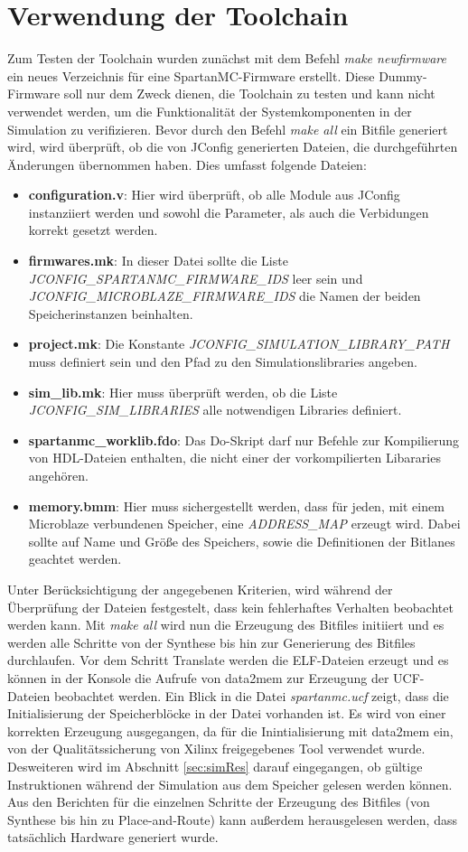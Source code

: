 \section{Verwendung der Toolchain}
Zum Testen der Toolchain wurden zunächst mit dem Befehl \textit{make newfirmware} ein neues Verzeichnis für eine SpartanMC-Firmware erstellt. Diese Dummy-Firmware soll nur dem Zweck dienen, die Toolchain zu testen und kann nicht verwendet werden, um die Funktionalität der Systemkomponenten in der Simulation zu verifizieren. Bevor durch den Befehl \textit{make all} ein Bitfile generiert wird, wird überprüft, ob die von JConfig generierten Dateien, die durchgeführten Änderungen übernommen haben. Dies umfasst folgende Dateien:
\begin{itemize}
	\item \textbf{configuration.v}: Hier wird überprüft, ob alle Module aus JConfig instanziiert werden und sowohl die Parameter, als auch die Verbidungen korrekt gesetzt werden.
	\item \textbf{firmwares.mk}: In dieser Datei sollte die Liste \textit{JCONFIG\_SPARTANMC\_FIRMWARE\_IDS} leer sein und \textit{JCONFIG\_MICROBLAZE\_FIRMWARE\_IDS} die Namen der beiden Speicherinstanzen beinhalten.
	\item \textbf{project.mk}: Die Konstante \textit{JCONFIG\_SIMULATION\_LIBRARY\_PATH} muss definiert sein und den Pfad zu den Simulationslibraries angeben.
	\item \textbf{sim\_lib.mk}: Hier muss überprüft werden, ob die Liste \textit{JCONFIG\_SIM\_LIBRARIES} alle notwendigen Libraries definiert.
	\item \textbf{spartanmc\_worklib.fdo}: Das Do-Skript darf nur Befehle zur Kompilierung von HDL-Dateien enthalten, die nicht einer der vorkompilierten Libararies angehören.
	\item \textbf{memory.bmm}: Hier muss sichergestellt werden, dass für jeden, mit einem Microblaze verbundenen Speicher, eine \textit{ADDRESS\_MAP} erzeugt wird. Dabei sollte auf Name und Größe des Speichers, sowie die Definitionen der Bitlanes geachtet werden.
\end{itemize}
Unter Berücksichtigung der angegebenen Kriterien, wird während der Überprüfung der Dateien festgestelt, dass kein fehlerhaftes Verhalten beobachtet werden kann. Mit \textit{make all} wird nun die Erzeugung des Bitfiles initiiert und es werden alle Schritte von der Synthese bis hin zur Generierung des Bitfiles durchlaufen. Vor dem Schritt Translate werden die ELF-Dateien erzeugt und es können in der Konsole die Aufrufe von data2mem zur Erzeugung der UCF-Dateien beobachtet werden. Ein Blick in die Datei \textit{spartanmc.ucf} zeigt, dass die Initialisierung der Speicherblöcke in der Datei vorhanden ist. Es wird von einer korrekten Erzeugung ausgegangen, da für die Inintialisierung mit data2mem ein, von der Qualitätssicherung von Xilinx freigegebenes Tool verwendet wurde. Desweiteren wird im Abschnitt \ref{sec:simRes} darauf eingegangen, ob gültige Instruktionen während der Simulation aus dem Speicher gelesen werden können. Aus den Berichten für die einzelnen Schritte der Erzeugung des Bitfiles (von Synthese bis hin zu Place-and-Route) kann außerdem herausgelesen werden, dass tatsächlich Hardware generiert wurde.\\
